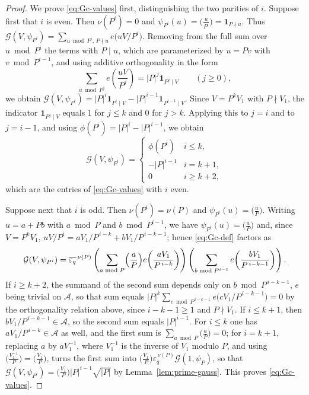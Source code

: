\documentclass[a4paper,reqno]{amsart}
\numberwithin{equation}{section}
\theoremstyle{remark}
\theoremstyle{definition}
\newcommand{\A}{\mathcal{A}}
\newcommand{\epsq}{\varepsilon_q}
\newcommand{\Gc}{\mathcal{G}}
\begin{document}
\begin{proof}
We prove \eqref{eq:Gc-values} first, distinguishing the two parities of $i$.
Suppose first that $i$ is even. Then $\nu(P^i)=0$ and $\psi_{P^i}(u)=\bigl(\frac{u}{P^i}\bigr)=\mathbf 1_{P\nmid u}$.
Thus $\Gc(V,\psi_{P^i})=\sum_{u\bmod P^i,\,P\nmid u}e\bigl(uV/P^i\bigr)$.
Removing from the full
sum over $u\bmod P^i$ the terms with $P\mid u$, which are parameterized by
$u=Pv$ with $v\bmod P^{i-1}$, and using additive orthogonality in the form
$$
\sum_{u\bmod P^j}e\!\left(\frac{uV}{P^j}\right)=|P|^j\mathbf 1_{P^j\mid V}
\qquad(j\ge0),
$$
we obtain $\Gc(V,\psi_{P^i})=|P|^i\mathbf 1_{P^i\mid V}-|P|^{i-1}\mathbf 1_{P^{i-1}\mid V}$.
Since $V=P^kV_1$ with $P\nmid V_1$, the indicator $\mathbf 1_{P^j\mid V}$
equals $1$ for $j\le k$ and $0$ for $j>k$. Applying this to $j=i$ and to
$j=i-1$, and using $\phi(P^i)=|P|^i-|P|^{i-1}$, we obtain
$$
\Gc(V,\psi_{P^i})
=\begin{cases}
\phi(P^i)& i\le k,\\
-|P|^{i-1}& i=k+1,\\
0& i\ge k+2,
\end{cases}
$$
which are the entries of \eqref{eq:Gc-values} with $i$ even.

Suppose next that $i$ is odd. Then $\nu(P^i)=\nu(P)$ and
$\psi_{P^i}(u)=\bigl(\frac uP\bigr)$. Writing $u=a+Pb$ with $a\bmod P$ and
$b\bmod P^{i-1}$, we have $\psi_{P^i}(u)=\bigl(\frac aP\bigr)$ and, since
$V=P^kV_1$, $uV/P^i=aV_1/P^{\,i-k}+bV_1/P^{\,i-k-1}$; hence
\eqref{eq:Gc-def} factors as
$$
\Gc(V,\psi_{P^i})
=\overline{\epsq}^{\,\nu(P)}
\left(\sum_{a\bmod P}\Bigl(\frac aP\Bigr)e\!\left(\frac{aV_1}{P^{\,i-k}}\right)\right)
\left(\sum_{b\bmod P^{i-1}}e\!\left(\frac{bV_1}{P^{\,i-k-1}}\right)\right).
$$
If $i\ge k+2$, the summand of the second sum depends only on
$b\bmod P^{\,i-k-1}$, $e$ being trivial on $\A$, so that sum equals
$|P|^{k}\sum_{c\bmod P^{\,i-k-1}}e\bigl(cV_1/P^{\,i-k-1}\bigr)=0$ by the
orthogonality relation above, since $i-k-1\ge1$ and $P\nmid V_1$.
If $i\le k+1$, then $bV_1/P^{\,i-k-1}\in\A$, so the second sum equals
$|P|^{i-1}$. For $i\le k$ one has $aV_1/P^{\,i-k}\in\A$ as well, and the
first sum is $\sum_{a\bmod P}\bigl(\frac aP\bigr)=0$; for $i=k+1$, replacing
$a$ by $aV_1^{-1}$, where $V_1^{-1}$ is the inverse of $V_1$ modulo $P$, and
using $\bigl(\frac{V_1^{-1}}{P}\bigr)=\bigl(\frac{V_1}{P}\bigr)$, turns the
first sum into
$\bigl(\frac{V_1}{P}\bigr)\epsq^{\,\nu(P)}\Gc(1,\psi_P)$, so that
$\Gc(V,\psi_{P^i})=\bigl(\frac{V_1}{P}\bigr)|P|^{i-1}\sqrt{|P|}$ by
Lemma~\ref{lem:prime-gauss}. This proves \eqref{eq:Gc-values}.


\end{proof}
\end{document}
